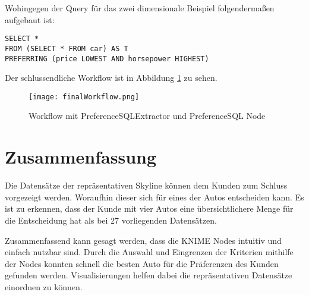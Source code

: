 Wohingegen der Query für das zwei dimensionale Beispiel folgendermaßen aufgebaut ist:

\begin{verbatim}
SELECT * 
FROM (SELECT * FROM car) AS T 
PREFERRING (price LOWEST AND horsepower HIGHEST)
\end{verbatim}

Der schlussendliche Workflow ist in Abbildung \ref{img:finalWorkflow} zu sehen. 
 
\begin{figure}[H]
	\centering
	\texttt{[image: finalWorkflow.png]}
	\caption{Workflow mit PreferenceSQLExtractor und PreferenceSQL Node}
	\label{img:finalWorkflow}
\end{figure} 
\section{Zusammenfassung}
\label{ch:Evaluierung:sec:zusammenfassung}
Die Datensätze der repräsentativen Skyline können dem Kunden zum Schluss vorgezeigt werden. Woraufhin dieser sich für eines der Autos entscheiden kann. Es ist zu erkennen, dass der Kunde mit vier Autos eine übersichtlichere Menge für die Entscheidung hat als bei 27 vorliegenden Datensätzen.

Zusammenfassend kann gesagt werden, dass die KNIME Nodes intuitiv und einfach nutzbar sind. Durch die Auswahl und Eingrenzen der Kriterien mithilfe der Nodes konnten schnell die besten Auto für die Präferenzen des Kunden gefunden werden. Visualisierungen helfen dabei die repräsentativen Datensätze einordnen zu können. 
